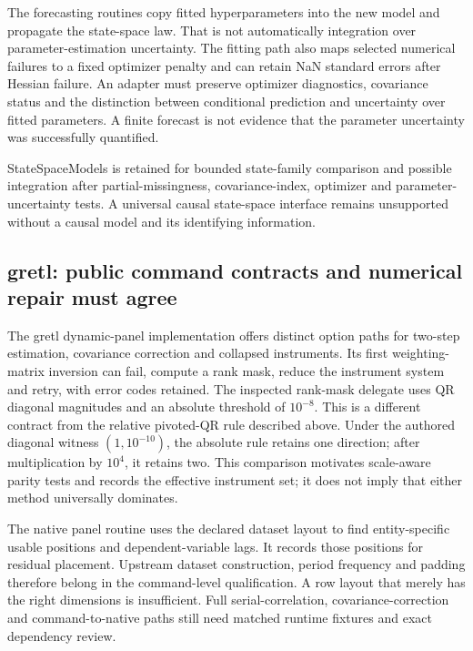 The forecasting routines copy fitted hyperparameters into the new model and propagate the state-space law. That is not automatically integration over parameter-estimation uncertainty. The fitting path also maps selected numerical failures to a fixed optimizer penalty and can retain NaN standard errors after Hessian failure. An adapter must preserve optimizer diagnostics, covariance status and the distinction between conditional prediction and uncertainty over fitted parameters. A finite forecast is not evidence that the parameter uncertainty was successfully quantified.

StateSpaceModels is retained for bounded state-family comparison and possible integration after partial-missingness, covariance-index, optimizer and parameter-uncertainty tests. A universal causal state-space interface remains unsupported without a causal model and its identifying information.~\citep{exec25_odyn_ssm,exec25_odyn_choice}

\subsection{gretl: public command contracts and numerical repair must agree}

The gretl dynamic-panel implementation offers distinct option paths for two-step estimation, covariance correction and collapsed instruments. Its first weighting-matrix inversion can fail, compute a rank mask, reduce the instrument system and retry, with error codes retained. The inspected rank-mask delegate uses QR diagonal magnitudes and an absolute threshold of $10^{-8}$. This is a different contract from the relative pivoted-QR rule described above. Under the authored diagonal witness $(1,10^{-10})$, the absolute rule retains one direction; after multiplication by $10^4$, it retains two. This comparison motivates scale-aware parity tests and records the effective instrument set; it does not imply that either method universally dominates.~\citep{exec25_odyn_gretl,exec25_odyn_choice}

The native panel routine uses the declared dataset layout to find entity-specific usable positions and dependent-variable lags. It records those positions for residual placement. Upstream dataset construction, period frequency and padding therefore belong in the command-level qualification. A row layout that merely has the right dimensions is insufficient. Full serial-correlation, covariance-correction and command-to-native paths still need matched runtime fixtures and exact dependency review.


